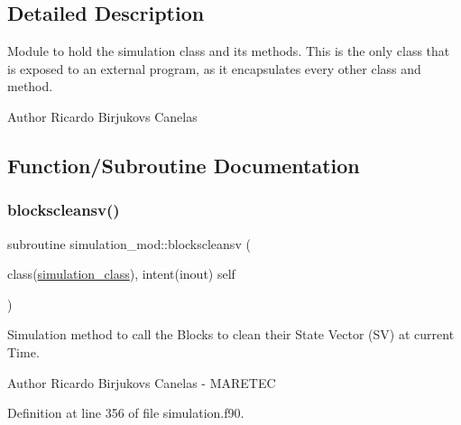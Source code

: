 \subsection{Detailed Description}
Module to hold the simulation class and its methods. This is the only class that is exposed to an external program, as it encapsulates every other class and method. 

\begin{DoxyAuthor}{Author}
Ricardo Birjukovs Canelas 
\end{DoxyAuthor}


\subsection{Function/\+Subroutine Documentation}
\mbox{\label{namespacesimulation__mod_a4cec8fb4baf1b2f69cd2699b0c5b9a55}} 
\subsubsection{\texorpdfstring{blockscleansv()}{blockscleansv()}}
{\footnotesize\ttfamily subroutine simulation\+\_\+mod\+::blockscleansv (\begin{DoxyParamCaption}\item[{class(\mbox{\hyperlink{structsimulation__mod_1_1simulation__class}{simulation\+\_\+class}}), intent(inout)}]{self }\end{DoxyParamCaption})\hspace{0.3cm}{\ttfamily [private]}}



Simulation method to call the Blocks to clean their State Vector (SV) at current Time. 

\begin{DoxyAuthor}{Author}
Ricardo Birjukovs Canelas -\/ M\+A\+R\+E\+T\+EC 
\end{DoxyAuthor}


Definition at line 356 of file simulation.\+f90.


\mbox{\label{namespacesimulation__mod_a8390f0a56ff2678d144af1dd09517a5e}} 
